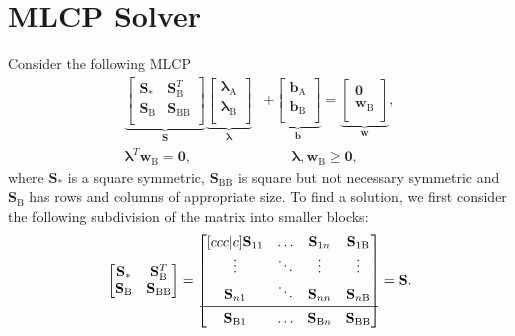 \documentclass[preprint,12pt]{elsarticle}
\let\vec\bm
\let\mat\mathbf
\numberwithin{equation}{section}
\def\tA{\text{A}}
\def\tB{\text{B}}
\newcommand{\complementarityalign}[2]{{#1}^T{#2}=\vec{0}, &\qquad #1, #2 \geq \vec{0}}
\begin{document}
\section{MLCP Solver}
\label{appendix:solver}
Consider the following MLCP
\begin{equation}
    \label{eq:generic_mlcp}
    \begin{aligned}
        \underbrace{
        \begin{bmatrix}
            \mat{S}_* & \mat{S}_{\text{B}}^T     \\
            \mat{S}_{\text{B}} & \mat{S}_{\text{BB}} \\
        \end{bmatrix}
        }_\mat{S}
        \underbrace{
        \begin{bmatrix}
            \vec{\lambda}_\tA   \\
            \vec{\lambda}_\tB \\
        \end{bmatrix}}_{\vec{\lambda}}
         & +
        \underbrace{
        \begin{bmatrix}
            \vec{b}_\tA \\
            \vec{b}_\tB \\
        \end{bmatrix}}_{\vec{b}}
        =
        \underbrace{
        \begin{bmatrix}
            \vec{0}   \\
            \vec{w}_\tB \\
        \end{bmatrix}
        }_{\vec{w}}, \\
        \complementarityalign{\vec{\lambda}}{\vec{w}_\tB},
    \end{aligned}
\end{equation}
where $\mat{S}_*$ is a square symmetric, $\mat{S}_{\text{BB}}$ is square but not necessary symmetric and $\mat{S}_{\text{B}}$ has rows and columns of appropriate size.
To find a solution, we first consider the following subdivision of the matrix into smaller blocks:
\begin{equation}
    \label{eq:mlcp_schur_block}
    \begin{bmatrix}
        \mat{S}_* & \mat{S}_{\text{B}}^T     \\
        \mat{S}_{\text{B}} & \mat{S}_{\text{BB}} \\
    \end{bmatrix}
    =
    \begin{bmatrix}[ccc|c]
        \mat{S}_{11} & \hdots & \mat{S}_{1n} & \mat{S}_{1 \tB} \\
        \vdots       & \ddots & \vdots       & \vdots       \\
        \mat{S}_{n1} & \ddots & \mat{S}_{nn} & \mat{S}_{n \tB} \\
        \midrule
        \mat{S}_{\tB 1} & \hdots & \mat{S}_{\tB n} & \mat{S}_{\tB \tB} \\
    \end{bmatrix}
    =
    \mat{S}.
\end{equation}
\end{document}
